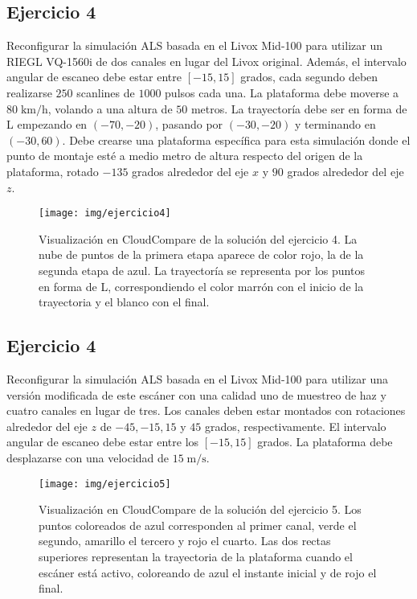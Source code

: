 \documentclass[]{article}
\begin{document}
	\subsection*{Ejercicio 4}
	Reconfigurar la simulación ALS basada en el Livox Mid-100 para utilizar un RIEGL VQ-1560i de dos canales en lugar del Livox original. Además, el intervalo angular de escaneo debe estar entre $[-15, 15]$ grados, cada segundo deben realizarse $250$ scanlines de $1000$ pulsos cada una. La plataforma debe moverse a $80\;\mathrm{km}/\mathrm{h}$, volando a una altura de $50$ metros. La trayectoría debe ser en forma de L empezando en $(-70, -20)$, pasando por $(-30, -20)$ y terminando en $(-30, 60)$. Debe crearse una plataforma específica para esta simulación donde el punto de montaje esté a medio metro de altura respecto del origen de la plataforma, rotado $-135$ grados alrededor del eje $x$ y $90$ grados alrededor del eje $z$.

	\begin{figure}[htb]
		\centering
		\texttt{[image: img/ejercicio4]}
		\caption{Visualización en CloudCompare de la solución del ejercicio 4. La nube de puntos de la primera etapa aparece de color rojo, la de la segunda etapa de azul. La trayectoría se representa por los puntos en forma de L, correspondiendo el color marrón con el inicio de la trayectoria y el blanco con el final.}
		\label{fig:ejercicio4}
	\end{figure} 
	
	\pagebreak
	
	
	\subsection*{Ejercicio 4}
	Reconfigurar la simulación ALS basada en el Livox Mid-100 para utilizar una versión modificada de este escáner con una calidad uno de muestreo de haz y cuatro canales en lugar de tres. Los canales deben estar montados con rotaciones alrededor del eje $z$ de $-45, -15, 15$ y $45$ grados, respectivamente. El intervalo angular de escaneo debe estar entre los $[-15, 15]$ grados. La plataforma debe desplazarse con una velocidad de $15\;\mathrm{m}/\mathrm{s}$.
	
	\begin{figure}[htb]
		\centering
		\texttt{[image: img/ejercicio5]}
		\caption{Visualización en CloudCompare de la solución del ejercicio 5. Los puntos coloreados de azul corresponden al primer canal, verde el segundo, amarillo el tercero y rojo el cuarto. Las dos rectas superiores representan la trayectoria de la plataforma cuando el escáner está activo, coloreando de azul el instante inicial y de rojo el final.}
		\label{fig:ejercicio5}
	\end{figure} 


	
\end{document}
